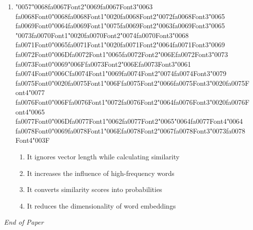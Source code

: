 \documentclass[12pt]{article}
\begin{document}
\begin{enumerate}[label=Q\arabic*.]
\item {\char"0057}{\char"0068}{\csname fa0067Font2\endcsname\char"0069}{\csname fa0067Font3\endcsname\char"0063} {\csname fa0068Font0\endcsname\char"0068}{\csname fa0068Font1\endcsname\char"0020}{\csname fa0068Font2\endcsname\char"0072}{\csname fa0068Font3\endcsname\char"0065} {\csname fa0069Font0\endcsname\char"0064}{\csname fa0069Font1\endcsname\char"0075}{\csname fa0069Font2\endcsname\char"0063}{\csname fa0069Font3\endcsname\char"0065} {\char"0073}{\csname fa0070Font1\endcsname\char"0020}{\csname fa0070Font2\endcsname\char"0074}{\csname fa0070Font3\endcsname\char"0068} {\csname fa0071Font0\endcsname\char"0065}{\csname fa0071Font1\endcsname\char"0020}{\csname fa0071Font2\endcsname\char"0064}{\csname fa0071Font3\endcsname\char"0069} {\csname fa0072Font0\endcsname\char"006D}{\csname fa0072Font1\endcsname\char"0065}{\csname fa0072Font2\endcsname\char"006E}{\csname fa0072Font3\endcsname\char"0073} {\csname fa0073Font0\endcsname\char"0069}{\char"006F}{\csname fa0073Font2\endcsname\char"006E}{\csname fa0073Font3\endcsname\char"0061} {\csname fa0074Font0\endcsname\char"006C}{\csname fa0074Font1\endcsname\char"0069}{\csname fa0074Font2\endcsname\char"0074}{\csname fa0074Font3\endcsname\char"0079} {\csname fa0075Font0\endcsname\char"0020}{\csname fa0075Font1\endcsname\char"006F}{\csname fa0075Font2\endcsname\char"0066}{\csname fa0075Font3\endcsname\char"0020}{\csname fa0075Font4\endcsname\char"0077} {\csname fa0076Font0\endcsname\char"006F}{\csname fa0076Font1\endcsname\char"0072}{\csname fa0076Font2\endcsname\char"0064}{\csname fa0076Font3\endcsname\char"0020}{\csname fa0076Font4\endcsname\char"0065} {\csname fa0077Font0\endcsname\char"006D}{\csname fa0077Font1\endcsname\char"0062}{\csname fa0077Font2\endcsname\char"0065}{\char"0064}{\csname fa0077Font4\endcsname\char"0064} {\csname fa0078Font0\endcsname\char"0069}{\csname fa0078Font1\endcsname\char"006E}{\csname fa0078Font2\endcsname\char"0067}{\csname fa0078Font3\endcsname\char"0073}{\csname fa0078Font4\endcsname\char"003F}
\begin{enumerate}[label=(\Alph*)]
    \item It ignores vector length while calculating similarity
    \item It increases the influence of high-frequency words
    \item It converts similarity scores into probabilities
    \item It reduces the dimensionality of word embeddings
\end{enumerate}
\end{enumerate}

\vfill
\noindent\textit{End of Paper}
\end{document}

